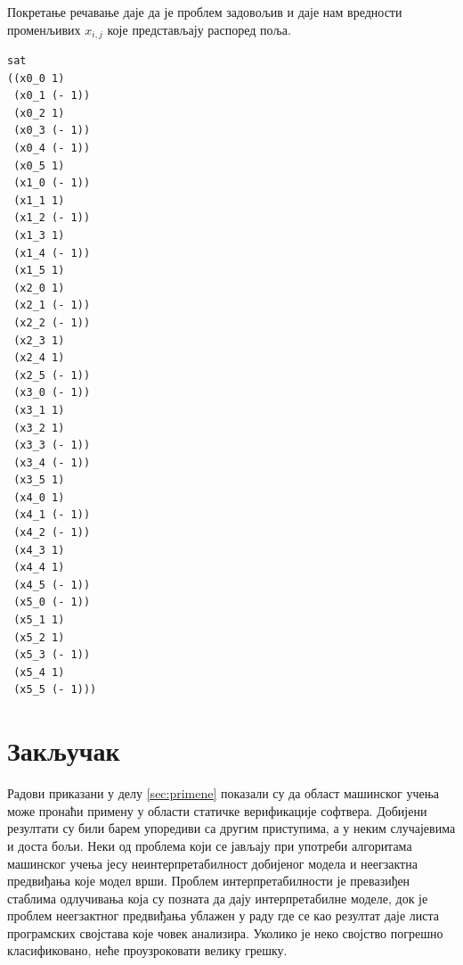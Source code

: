 \documentclass[a4paper]{article}
\begin{document}
Покретање речавање даје да је проблем задовољив и даје нам вредности променљивих $x_{i, j}$ које представљају
распоред поља.

\begin{verbatim}
sat
((x0_0 1)
 (x0_1 (- 1))
 (x0_2 1)
 (x0_3 (- 1))
 (x0_4 (- 1))
 (x0_5 1)
 (x1_0 (- 1))
 (x1_1 1)
 (x1_2 (- 1))
 (x1_3 1)
 (x1_4 (- 1))
 (x1_5 1)
 (x2_0 1)
 (x2_1 (- 1))
 (x2_2 (- 1))
 (x2_3 1)
 (x2_4 1)
 (x2_5 (- 1))
 (x3_0 (- 1))
 (x3_1 1)
 (x3_2 1)
 (x3_3 (- 1))
 (x3_4 (- 1))
 (x3_5 1)
 (x4_0 1)
 (x4_1 (- 1))
 (x4_2 (- 1))
 (x4_3 1)
 (x4_4 1)
 (x4_5 (- 1))
 (x5_0 (- 1))
 (x5_1 1)
 (x5_2 1)
 (x5_3 (- 1))
 (x5_4 1)
 (x5_5 (- 1)))
\end{verbatim}


\section{Закључак}
Радови приказани у делу \ref{sec:primene} показали су да област машинског учења може пронаћи примену у области статичке
верификације софтвера. Добијени резултати су били барем упоредиви са другим приступима, а у неким случајевима и доста
бољи. Неки од проблема који се јављају при употреби алгоритама машинског учења јесу неинтерпретабилност добијеног модела и
неегзактна предвиђања које модел врши. Проблем интерпретабилности је превазиђен стаблима одлучивања \cite{KrishnaPW15, Sharma_interpolantsas}
која су позната да дају интерпретабилне моделе, док је проблем неегзактног предвиђања ублажен у раду \cite{Brun04findinglatent}
где се као резултат даје листа програмских својстава које човек анализира. Уколико је неко својство погрешно класификовано,
неће проузроковати велику грешку.

\appendix


\end{document}
